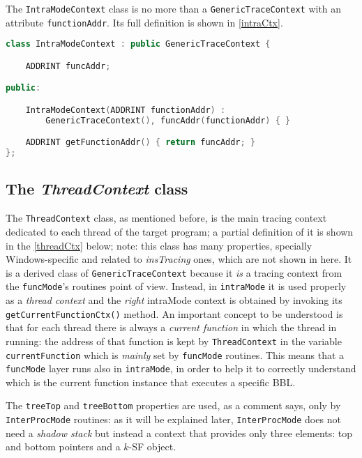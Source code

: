 \documentclass[a4paper,10pt]{report}
\begin{document}
The \verb|IntraModeContext| class is no more than a
\verb|GenericTraceContext| with an attribute \verb|functionAddr|.
Its full definition is shown in \cref{intraCtx}.

\begin{lstlisting}[language=C++,
	caption={definition of \texttt{IntraModeContext}},
	label=intraCtx, frame=leftline]
class IntraModeContext : public GenericTraceContext {

	ADDRINT funcAddr;

public:

	IntraModeContext(ADDRINT functionAddr) :
		GenericTraceContext(), funcAddr(functionAddr) { }

	ADDRINT getFunctionAddr() { return funcAddr; }
};


\end{lstlisting}

\subsection{The \emph{ThreadContext} class}

The \verb|ThreadContext| class, as mentioned before, is the main
tracing context dedicated to each thread of the target program;
a partial definition of it is shown in the \cref{threadCtx} below;
note: this class has many properties,
specially Windows-specific and related to \emph{insTracing} ones,
which are not shown in here.
It is a derived class of \verb|GenericTraceContext| because it \emph{is}
a tracing context from the \verb|funcMode|'s routines point of view.
Instead, in \verb|intraMode| it is used properly as a \emph{thread context}
and the \emph{right} intraMode context is obtained by invoking its
\verb|getCurrentFunctionCtx()| method.
An important concept to be understood is that for each thread there is
always a \emph{current function} in which the thread in running:
the address of that function is kept by \verb|ThreadContext| in the
variable \verb|currentFunction| which is \emph{mainly} set by \verb|funcMode|
routines. This means that a \verb|funcMode| layer runs also in \verb|intraMode|,
in order to help it to correctly understand which is
the current function instance that executes a specific BBL.

The \verb|treeTop| and \verb|treeBottom| properties are used, as a comment says,
only by \verb|InterProcMode| routines: as it will be explained later,
\verb|InterProcMode| does not need a \emph{shadow stack}
but instead a context that provides only three elements:
top and bottom pointers and a $k$-SF object.
\end{document}
